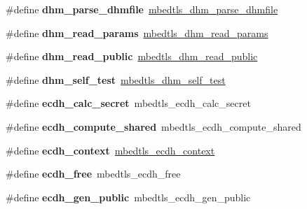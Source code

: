 \begin{DoxyCompactItemize}
\#define {\bfseries dhm\+\_\+parse\+\_\+dhmfile}~\mbox{\hyperlink{group__x509__module_gae2f53ca5e795b7e8674f092777a5a828}{mbedtls\+\_\+dhm\+\_\+parse\+\_\+dhmfile}}
\item 
\mbox{\label{compat-1_83_8h_af115d655528352bde630649377a0520e}} 
\#define {\bfseries dhm\+\_\+read\+\_\+params}~\mbox{\hyperlink{dhm_8h_a5348c82e9f13a7583aa9f17b5e841343}{mbedtls\+\_\+dhm\+\_\+read\+\_\+params}}
\item 
\mbox{\label{compat-1_83_8h_ae5cea64014dc21c6a96fc7b0ac513d72}} 
\#define {\bfseries dhm\+\_\+read\+\_\+public}~\mbox{\hyperlink{dhm_8h_a1fe799e776fd0f27eb4080248e547f3d}{mbedtls\+\_\+dhm\+\_\+read\+\_\+public}}
\item 
\mbox{\label{compat-1_83_8h_a91d92d3b3733ac769c494b6b962a85ed}} 
\#define {\bfseries dhm\+\_\+self\+\_\+test}~\mbox{\hyperlink{dhm_8h_a72a0942c0e297ed573b31dac50751795}{mbedtls\+\_\+dhm\+\_\+self\+\_\+test}}
\item 
\mbox{\label{compat-1_83_8h_a7086379163dee888f2e9a928b26bbb8b}} 
\#define {\bfseries ecdh\+\_\+calc\+\_\+secret}~mbedtls\+\_\+ecdh\+\_\+calc\+\_\+secret
\item 
\mbox{\label{compat-1_83_8h_a52728d6ec803314b48f913ec83b3020f}} 
\#define {\bfseries ecdh\+\_\+compute\+\_\+shared}~mbedtls\+\_\+ecdh\+\_\+compute\+\_\+shared
\item 
\mbox{\label{compat-1_83_8h_ac96cf479f0af593bef7a7e6606afe40b}} 
\#define {\bfseries ecdh\+\_\+context}~\mbox{\hyperlink{structmbedtls__ecdh__context}{mbedtls\+\_\+ecdh\+\_\+context}}
\item 
\mbox{\label{compat-1_83_8h_a0e480712779624cb15a5ce34dd2df9ea}} 
\#define {\bfseries ecdh\+\_\+free}~mbedtls\+\_\+ecdh\+\_\+free
\item 
\mbox{\label{compat-1_83_8h_af79e065c82e29fe34b938d228e0573fb}} 
\#define {\bfseries ecdh\+\_\+gen\+\_\+public}~mbedtls\+\_\+ecdh\+\_\+gen\+\_\+public
\item 
\mbox{\label{compat-1_83_8h_a810bcc80f67f9d1b4561450199cec821}} 

\end{DoxyCompactItemize}
